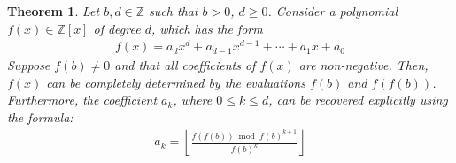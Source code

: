 \documentclass[12pt,reqno]{article}
\theoremstyle{plain}
\newtheorem{theorem}{Theorem}
\theoremstyle{definition}
\newcommand{\floor}[1]{\left\lfloor #1 \right\rfloor}
\begin{document}
\begin{theorem} \label{theorem:encoding}
Let $b, d \in \mathbb{Z}$ such that $b > 0$, $d \geq 0$. Consider a polynomial $f(x) \in \mathbb{Z}[x]$ of degree $d$, which has the form
\begin{align*}
    f(x) = a_d x^d + a_{d-1} x^{d-1} + \cdots + a_1 x + a_0
\end{align*}
Suppose $f(b) \not= 0$ and that all coefficients of $f(x)$ are non-negative. Then, $f(x)$ can be completely determined by the evaluations $f(b)$ and $f(f(b))$. Furthermore, the coefficient $a_k$, where $0 \leq k \leq d$, can be recovered explicitly using the formula:
\begin{align*}
a_k = \floor{\frac{f(f(b)) \bmod{f(b)^{k + 1}}}{f(b)^{k}}}
\end{align*}
\end{theorem}
\end{document}
